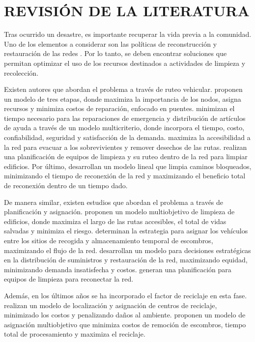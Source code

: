 \documentclass[letterpaper,conference]{IEEEtran}
\begin{document}
\section{REVISIÓN DE LA LITERATURA}

Tras ocurrido un desastre, es importante recuperar la vida previa a la comunidad. Uno de los elementos a considerar son las políticas de reconstrucción y restauración de las redes \citet{Feng2003}. Por lo tanto, se deben encontrar soluciones que permitan optimizar el uso de los recursos destinados a actividades de limpieza y recolección.

Existen autores que abordan el problema a través de ruteo vehicular. \citet{Karlaftis2007} proponen un modelo de tres etapas, donde maximiza la importancia de los nodos, asigna recursos y minimiza costos de reparación, enfocado en puentes. \citet{Liberatore2014} minimizan el tiempo necesario para las reparaciones de emergencia y distribución de artículos de ayuda a través de un modelo multicriterio, donde incorpora el tiempo, costo, confiabilidad, seguridad y satisfacción de la demanda. \citet{Aksu2014} maximiza la accesibilidad a la red para evacuar a los sobrevivientes y remover desechos de las rutas. \citet{MayaDuque2016} realizan una planificación de equipos de limpieza y su ruteo dentro de la red para limpiar edificios. Por último, \citet{Kasaei2016} desarrollan un modelo lineal que limpia caminos bloqueados, minimizando el tiempo de reconexión de la red y maximizando el beneficio total de reconexión dentro de un tiempo dado.

De manera similar, existen estudios que abordan el problema a través de planificación y asignación. \citet{Feng2003} proponen un modelo multiobjetivo de limpieza de edificios, donde maximiza el largo de las rutas accesibles, el total de vidas salvadas y minimiza el riesgo. \citet{Brooks2013} determinan la estrategia para asignar los vehículos entre los sitios de recogida y almacenamiento temporal de escombros, maximizando el flujo de la red. \citet{Ransikarbum2016} desarrollan un modelo para decisiones estratégicas en la distribución de suministros y restauración de la red, maximizando equidad, minimizando demanda insatisfecha y costos. \citet{Akbari2017} generan una planificación para equipos de limpieza para reconectar la red.

Además, en los últimos años se ha incorporado el factor de reciclaje en esta fase. \citet{Boonmee2018} realizan un modelo de localización y asignación de centros de reciclaje, minimizado los costos y penalizando daños al ambiente. \citet{Wang2019} proponen un modelo de asignación multiobjetivo que minimiza costos de remoción de escombros, tiempo total de procesamiento y maximiza el reciclaje.
\end{document}
